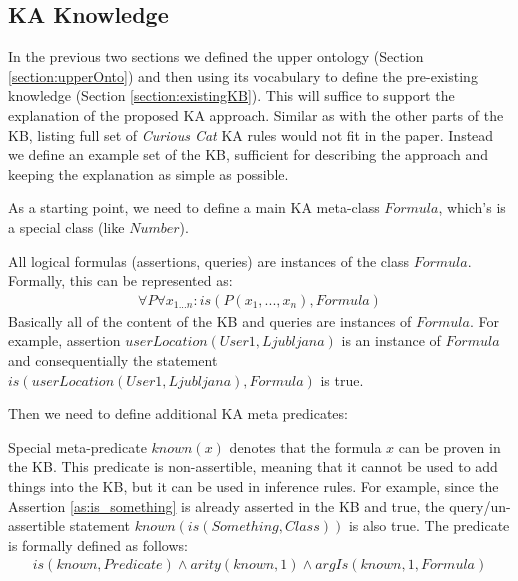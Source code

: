 \subsection{KA Knowledge}
\label{section:kakb}
In the previous two sections we defined the upper ontology
(Section \ref{section:upperOnto}) and then using its vocabulary to define the 
pre-existing knowledge (Section \ref{section:existingKB}). This will suffice to
support the explanation of the proposed KA approach. Similar as with the other
parts of the KB, listing full set of 
\emph{Curious Cat} KA rules would not fit in the paper. Instead we define an 
example set of the KB, sufficient for describing the approach and keeping the 
explanation as simple as possible. 

As a starting point, we need to define a main KA meta-class $Formula$, which’s 
is a special class (like $Number$).
\begin{definition}\label{def:formula}
All logical formulas (assertions, queries) are instances of the class $Formula$.
Formally, this can be represented as:
\begin{equation}\label{as:formulas}
\begin{gathered}
	\forall P\forall x_{1...n}:is(P(x_1,...,x_n),Formula)
\end{gathered}
\end{equation}
Basically all of the content of the KB and queries are instances of $Formula$.
For example, assertion $userLocation(User1,Ljubljana)$ is an instance of 
$Formula$ and consequentially the statement $is(userLocation(User1,Ljubljana),
Formula)$ is true.
\end{definition}

Then we need to define additional KA meta predicates:

\begin{definition}\label{def:pred_known}
Special meta-predicate $known(x)$ denotes that the formula $x$ can be proven 
in the KB. This predicate is non-assertible, meaning that it cannot be used
to add things into the KB, but it can be used in inference rules. For example,
since the Assertion \ref{as:is_something} is already asserted in the KB and 
true, the query/un-assertible statement $known(is(Something,Class))$ is also 
true. The predicate is formally defined as follows:
\begin{equation}\label{as:known}
\begin{gathered}
	is(known,Predicate) \land arity(known,1) \land argIs(known,1,Formula)
\end{gathered}
\end{equation}
\end{definition}


